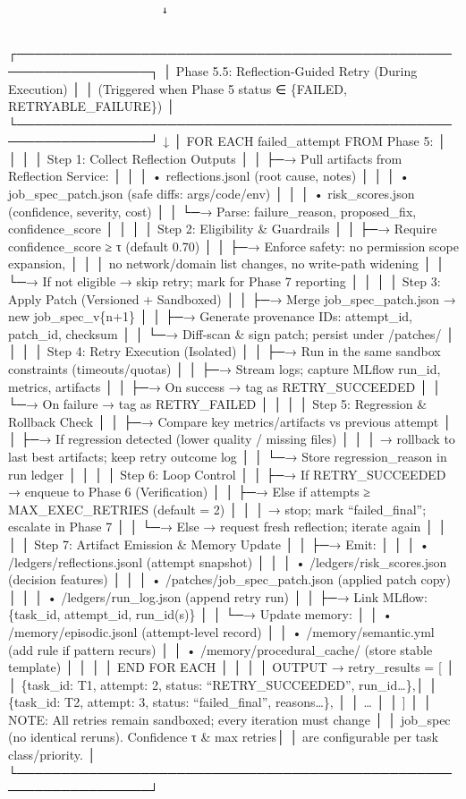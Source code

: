 \documentclass[
]{article}
\begin{document}
\begin{verbatim}
                        ↓
                        
\end{verbatim}

┌─────────────────────────────────────────────────────────────────┐ │
Phase 5.5: Reflection-Guided Retry (During Execution) │ │ (Triggered
when Phase 5 status ∈ \{FAILED, RETRYABLE\_FAILURE\}) │
└─────────────────────────────────────────────────────────────────┘ ↓ │
FOR EACH failed\_attempt FROM Phase 5: │ │ │ │ Step 1: Collect
Reflection Outputs │ │ ├─→ Pull artifacts from Reflection Service: │ │ │
• reflections.jsonl (root cause, notes) │ │ │ • job\_spec\_patch.json
(safe diffs: args/code/env) │ │ │ • risk\_scores.json (confidence,
severity, cost) │ │ └─→ Parse: failure\_reason, proposed\_fix,
confidence\_score │ │ │ │ Step 2: Eligibility \& Guardrails │ │ ├─→
Require confidence\_score ≥ τ (default 0.70) │ │ ├─→ Enforce safety: no
permission scope expansion, │ │ │ no network/domain list changes, no
write-path widening │ │ └─→ If not eligible → skip retry; mark for Phase
7 reporting │ │ │ │ Step 3: Apply Patch (Versioned + Sandboxed) │ │ ├─→
Merge job\_spec\_patch.json → new job\_spec\_v\{n+1\} │ │ ├─→ Generate
provenance IDs: attempt\_id, patch\_id, checksum │ │ └─→ Diff-scan \&
sign patch; persist under /patches/ │ │ │ │ Step 4: Retry Execution
(Isolated) │ │ ├─→ Run in the same sandbox constraints (timeouts/quotas)
│ │ ├─→ Stream logs; capture MLflow run\_id, metrics, artifacts │ │ ├─→
On success → tag as RETRY\_SUCCEEDED │ │ └─→ On failure → tag as
RETRY\_FAILED │ │ │ │ Step 5: Regression \& Rollback Check │ │ ├─→
Compare key metrics/artifacts vs previous attempt │ │ ├─→ If regression
detected (lower quality / missing files) │ │ │ → rollback to last best
artifacts; keep retry outcome log │ │ └─→ Store regression\_reason in
run ledger │ │ │ │ Step 6: Loop Control │ │ ├─→ If RETRY\_SUCCEEDED →
enqueue to Phase 6 (Verification) │ │ ├─→ Else if attempts ≥
MAX\_EXEC\_RETRIES (default = 2) │ │ │ → stop; mark ``failed\_final'';
escalate in Phase 7 │ │ └─→ Else → request fresh reflection; iterate
again │ │ │ │ Step 7: Artifact Emission \& Memory Update │ │ ├─→ Emit: │
│ │ • /ledgers/reflections.jsonl (attempt snapshot) │ │ │ •
/ledgers/risk\_scores.json (decision features) │ │ │ •
/patches/job\_spec\_patch.json (applied patch copy) │ │ │ •
/ledgers/run\_log.json (append retry run) │ │ ├─→ Link MLflow:
\{task\_id, attempt\_id, run\_id(s)\} │ │ └─→ Update memory: │ │ •
/memory/episodic.jsonl (attempt-level record) │ │ • /memory/semantic.yml
(add rule if pattern recurs) │ │ • /memory/procedural\_cache/ (store
stable template) │ │ │ │ END FOR EACH │ │ │ │ OUTPUT → retry\_results =
{[} │ │ \{task\_id: T1, attempt: 2, status: ``RETRY\_SUCCEEDED'',
run\_id\ldots\},│ │ \{task\_id: T2, attempt: 3, status:
``failed\_final'', reasons\ldots\}, │ │ \ldots{} │ │ {]} │ │ NOTE: All
retries remain sandboxed; every iteration must change │ │ job\_spec (no
identical reruns). Confidence τ \& max retries│ │ are configurable per
task class/priority. │
└─────────────────────────────────────────────────────────────────┘
\end{document}
